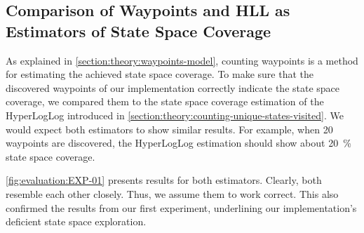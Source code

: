 \documentclass[
fancyheadings, %
%
%
]{stsreprt}
\begin{document}
\subsection{Comparison of Waypoints and HLL as Estimators of State Space Coverage}
\label{section:evaluation:waypoints-vs-hll}

As explained in \cref{section:theory:waypoints-model}, counting waypoints is a method for estimating the achieved state space coverage.
To make sure that the discovered waypoints of our implementation correctly indicate the state space coverage, we compared them to the state space coverage estimation of the HyperLogLog introduced in \cref{section:theory:counting-unique-states-visited}.
We would expect both estimators to show similar results.
For example, when 20 waypoints are discovered, the HyperLogLog estimation should show about \SI{20}{\percent} state space coverage.

\cref{fig:evaluation:EXP-01} presents results for both estimators.
Clearly, both resemble each other closely.
Thus, we assume them to work correct.
This also confirmed the results from our first experiment, underlining our implementation's deficient state space exploration.
\end{document}
